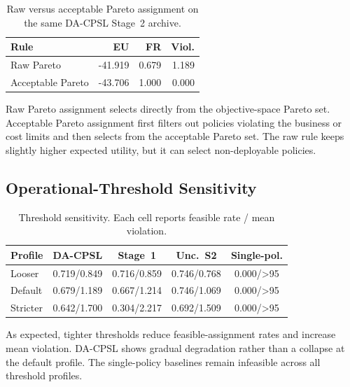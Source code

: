 \documentclass[sigconf,review,anonymous]{acmart}
\begin{document}
\begin{table}[!htbp]
\centering
\caption{Raw versus acceptable Pareto assignment on the same DA-CPSL Stage~2 archive.}
\label{tab:app-raw-vs-acceptable-assignment}
\begingroup
\small
\setlength{\tabcolsep}{4pt}
\renewcommand{\arraystretch}{1.10}
\begin{tabular*}{\columnwidth}{@{\extracolsep{\fill}}lrrr@{}}
\toprule
Rule & EU & FR & Viol. \\
\midrule
Raw Pareto & -41.919 & 0.679 & 1.189 \\
Acceptable Pareto & -43.706 & 1.000 & 0.000 \\
\bottomrule
\end{tabular*}
\endgroup
\end{table}

Raw Pareto assignment selects directly from the objective-space Pareto
set. Acceptable Pareto assignment first filters out policies violating
the business or cost limits and then selects from the acceptable Pareto
set. The raw rule keeps slightly higher expected utility, but it can
select non-deployable policies.

\subsection{Operational-Threshold Sensitivity}
\label{app:threshold-sensitivity}

\begin{table}[!htbp]
\centering
\caption{Threshold sensitivity. Each cell reports feasible rate / mean violation.}
\label{tab:app-threshold-sensitivity}
\begingroup
\scriptsize
\setlength{\tabcolsep}{2.5pt}
\renewcommand{\arraystretch}{1.10}
\begin{tabular*}{\columnwidth}{@{\extracolsep{\fill}}lcccc@{}}
\toprule
Profile & DA-CPSL & Stage~1 & Unc.~S2 & Single-pol. \\
\midrule
Looser & 0.719/0.849 & 0.716/0.859 & 0.746/0.768 & 0.000/>95 \\
Default & 0.679/1.189 & 0.667/1.214 & 0.746/1.069 & 0.000/>95 \\
Stricter & 0.642/1.700 & 0.304/2.217 & 0.692/1.509 & 0.000/>95 \\
\bottomrule
\end{tabular*}
\endgroup
\end{table}

As expected, tighter thresholds reduce feasible-assignment rates and
increase mean violation. DA-CPSL shows gradual degradation rather than a
collapse at the default profile. The single-policy baselines remain
infeasible across all threshold profiles.
\end{document}
